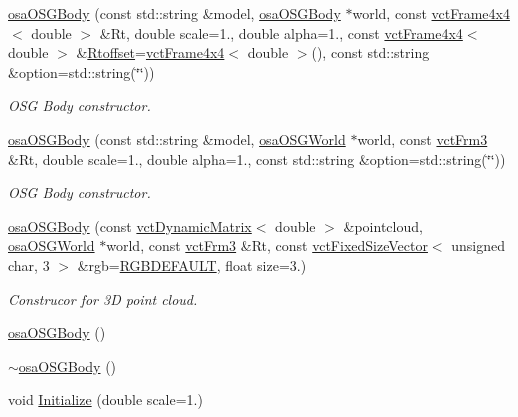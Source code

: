 \begin{DoxyCompactItemize}
\hyperlink{classosa_o_s_g_body_a16b475d99049179329a5f8ab7de26f94}{osa\-O\-S\-G\-Body} (const std\-::string \&model, \hyperlink{classosa_o_s_g_body}{osa\-O\-S\-G\-Body} $\ast$world, const \hyperlink{classvct_frame4x4}{vct\-Frame4x4}$<$ double $>$ \&Rt, double scale=1., double alpha=1., const \hyperlink{classvct_frame4x4}{vct\-Frame4x4}$<$ double $>$ \&\hyperlink{classosa_o_s_g_body_ad008984bdb0eda300948932eda13974a}{Rtoffset}=\hyperlink{classvct_frame4x4}{vct\-Frame4x4}$<$ double $>$(), const std\-::string \&option=std\-::string(\char`\"{}\char`\"{}))
\begin{DoxyCompactList}\small\item\em O\-S\-G Body constructor. \end{DoxyCompactList}\item 
\hyperlink{classosa_o_s_g_body_ad54afa91618639e95aad76b1b102a05f}{osa\-O\-S\-G\-Body} (const std\-::string \&model, \hyperlink{classosa_o_s_g_world}{osa\-O\-S\-G\-World} $\ast$world, const \hyperlink{vct_transformation_types_8h_a81feda0a02c2d1bc26e5553f409fed20}{vct\-Frm3} \&Rt, double scale=1., double alpha=1., const std\-::string \&option=std\-::string(\char`\"{}\char`\"{}))
\begin{DoxyCompactList}\small\item\em O\-S\-G Body constructor. \end{DoxyCompactList}\item 
\hyperlink{classosa_o_s_g_body_ad32c2836c65eaa78a179d22e39c2f759}{osa\-O\-S\-G\-Body} (const \hyperlink{classvct_dynamic_matrix}{vct\-Dynamic\-Matrix}$<$ double $>$ \&pointcloud, \hyperlink{classosa_o_s_g_world}{osa\-O\-S\-G\-World} $\ast$world, const \hyperlink{vct_transformation_types_8h_a81feda0a02c2d1bc26e5553f409fed20}{vct\-Frm3} \&Rt, const \hyperlink{classvct_fixed_size_vector}{vct\-Fixed\-Size\-Vector}$<$ unsigned char, 3 $>$ \&rgb=\hyperlink{classosa_o_s_g_body_a1fb439b90b8d0277e28240e35de006dd}{R\-G\-B\-D\-E\-F\-A\-U\-L\-T}, float size=3.)
\begin{DoxyCompactList}\small\item\em Construcor for 3\-D point cloud. \end{DoxyCompactList}\item 
\hyperlink{classosa_o_s_g_body_abf7933075da8ad26543fd13e82a1e1e2}{osa\-O\-S\-G\-Body} ()
\item 
\hyperlink{classosa_o_s_g_body_a07282fd85d9ea4e9ce8daf765b861b74}{$\sim$osa\-O\-S\-G\-Body} ()
\item 
void \hyperlink{classosa_o_s_g_body_a861b3d8a0ce96c9aacd6c3da33c5a415}{Initialize} (double scale=1.)

\end{DoxyCompactItemize}
